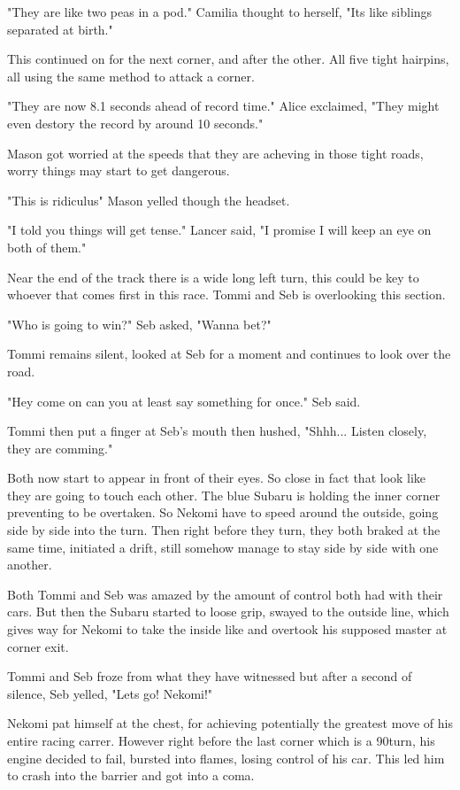 "They are like two peas in a pod." Camilia thought to herself, "Its like siblings separated at birth."

This continued on for the next corner, and after the other. All five tight hairpins, all using the same method to attack a corner.

"They are now 8.1 seconds ahead of record time." Alice exclaimed, "They might even destory the record by around 10 seconds."

Mason got worried at the speeds that they are acheving in those tight roads, worry things may start to get dangerous.

"This is ridiculus" Mason yelled though the headset.

"I told you things will get tense." Lancer said, "I promise I will keep an eye on both of them."

Near the end of the track there is a wide long left turn, this could be key to whoever that comes first in this race. Tommi and Seb is overlooking this section.

"Who is going to win?" Seb asked, "Wanna bet?"

Tommi remains silent, looked at Seb for a moment and continues to look over the road.

"Hey come on can you at least say something for once." Seb said.

Tommi then put a finger at Seb's mouth then hushed, "Shhh... Listen closely, they are comming."

Both now start to appear in front of their eyes. So close in fact that look like they are going to touch each other. The blue Subaru is holding the inner corner preventing to be overtaken. So Nekomi have to speed around the outside, going side by side into the turn. Then right before they turn, they both braked at the same time, initiated a drift, still somehow manage to stay side by side with one another.

Both Tommi and Seb was amazed by the amount of control both had with their cars. But then the Subaru started to loose grip, swayed to the outside line, which gives way for Nekomi to take the inside like and overtook his supposed master at corner exit.

Tommi and Seb froze from what they have witnessed but after a second of silence, Seb yelled, "Lets go! Nekomi!"

Nekomi pat himself at the chest, for achieving potentially the greatest move of his entire racing carrer. However right before the last corner which is a 90\textdegree turn, his engine decided to fail, bursted into flames, losing control of his car. This led him to crash into the barrier and got into a coma.

